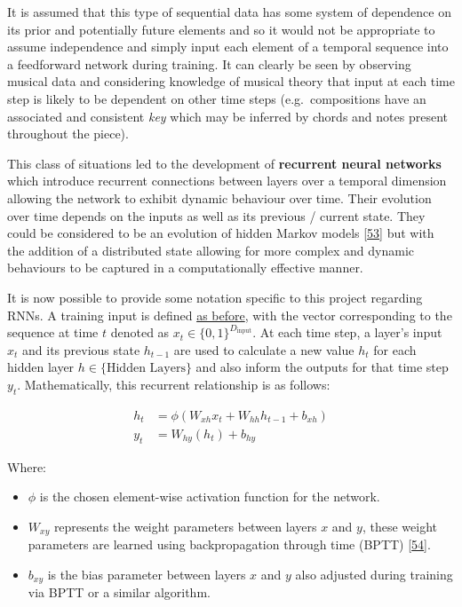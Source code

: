 \documentclass[12pt,]{article}
\providecommand{\tightlist}{%
  \setlength{\itemsep}{0pt}\setlength{\parskip}{0pt}}
\begin{document}
It is assumed that this type of sequential data has some system of
dependence on its prior and potentially future elements and so it would
not be appropriate to assume independence and simply input each element
of a temporal sequence into a feedforward network during training. It
can clearly be seen by observing musical data and considering knowledge
of musical theory that input at each time step is likely to be dependent
on other time steps (e.g.~compositions have an associated and consistent
\emph{key} which may be inferred by chords and notes present throughout
the piece).

This class of situations led to the development of \textbf{recurrent
neural networks} which introduce recurrent connections between layers
over a temporal dimension allowing the network to exhibit dynamic
behaviour over time. Their evolution over time depends on the inputs as
well as its previous / current state. They could be considered to be an
evolution of hidden Markov models
{[}\protect\hyperlink{ref-baum1966}{53}{]} but with the addition of a
distributed state allowing for more complex and dynamic behaviours to be
captured in a computationally effective manner.

It is now possible to provide some notation specific to this project
regarding RNNs. A training input is defined
\protect\hyperlink{buildinganeffectiverepresentationfortraining}{as
before}, with the vector corresponding to the sequence at time \(t\)
denoted as \(x_t\in \{0,1\}^{D_{\text{input}}}\). At each time step, a
layer's input \(x_t\) and its previous state \(h_{t-1}\) are used to
calculate a new value \(h_t\) for each hidden layer
\(h\in\{\text{Hidden Layers}\}\) and also inform the outputs for that
time step \(y_t\). Mathematically, this recurrent relationship is as
follows:

\[\begin{aligned}
h_t &= \phi(W_{xh} x_t + W_{hh} h_{t-1} + b_{xh}) \\
y_t &= W_{hy}(h_t) + b_{hy}
\end{aligned}\]

Where:

\begin{itemize}
\tightlist
\item
  \(\phi\) is the chosen element-wise activation function for the
  network.
\item
  \(W_{xy}\) represents the weight parameters between layers \(x\) and
  \(y\), these weight parameters are learned using backpropagation
  through time (BPTT)
  {[}\protect\hyperlink{ref-werbos1990backpropagation}{54}{]}.
\item
  \(b_{xy}\) is the bias parameter between layers \(x\) and \(y\) also
  adjusted during training via BPTT or a similar algorithm.
\end{itemize}
\end{document}
